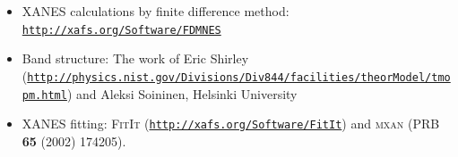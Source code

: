 \documentclass[10pt, xcolor=x11names, compress]{beamer}
\begin{document}
\begin{frame}
\begin{itemize}
\begin{itemize}
    \item XANES calculations by finite difference method:
      \href{http://xafs.org/Software/FDMNES}
      {\color{Purple4}\texttt{http://xafs.org/Software/FDMNES}}
    \item Band structure: The work of Eric Shirley
      (\href{http://physics.nist.gov/Divisions/Div844/facilities/theorModel/tmopm.html}
      {\color{Purple4}\tiny \texttt{http://physics.nist.gov/Divisions/Div844/facilities/theorModel/tmopm.html}}) and
      Aleksi Soininen, Helsinki University
    \item XANES fitting: \textsc{FitIt} (\href{http://xafs.org/Software/FitIt}{\color{Purple4}\texttt{http://xafs.org/Software/FitIt}})
      and \textsc{mxan} (PRB \textbf{65} (2002) 174205).
    \end{itemize}
  \end{itemize}
\end{frame}
\end{document}
